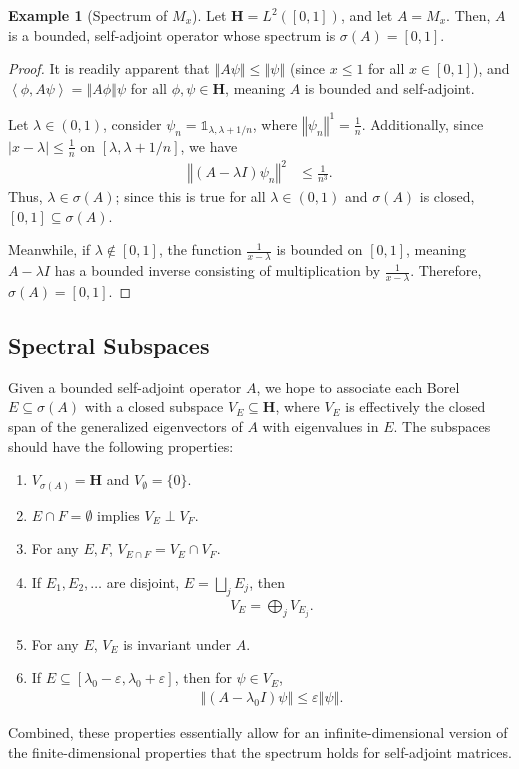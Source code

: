 \documentclass[10pt]{extarticle}
\newcommand{\iprod}[2]{\left\langle #1,#2\right\rangle}
\newcommand{\norm}[1]{\left\Vert #1\right\Vert}
\theoremstyle{plain}
\theoremstyle{definition}
\newtheorem*{example}{Example}
\theoremstyle{remark}
\renewcommand{\newline}{\hfill\break}
\begin{document}
  \begin{example}[Spectrum of $M_x$]
    Let $\mathbf{H} = L^{2}\left([0,1]\right)$, and let $A = M_x$. Then, $A$ is a bounded, self-adjoint operator whose spectrum is $\sigma(A) = [0,1]$.
  \end{example}
  \begin{proof}
    It is readily apparent that $\norm{A\psi} \leq \norm{\psi}$ (since $x\leq 1$ for all $x\in [0,1]$), and $\iprod{\phi}{A\psi} = \norm{A\phi}{\psi}$ for all $\phi,\psi \in \mathbf{H}$, meaning $A$ is bounded and self-adjoint.\newline

    Let $\lambda \in (0,1)$, consider $\psi_n = \mathbb{1}_{\lambda,\lambda + 1/n}$, where $\norm{\psi_n}^1 = \frac{1}{n}$. Additionally, since $|x - \lambda| \leq \frac{1}{n}$ on $[\lambda,\lambda + 1/n]$, we have
    \begin{align*}
      \norm{(A - \lambda I)\psi_n}^2 &\leq \frac{1}{n^3}.
    \end{align*}
    Thus, $\lambda \in \sigma(A)$; since this is true for all $\lambda \in (0,1)$ and $\sigma(A)$ is closed, $[0,1]\subseteq \sigma(A)$.\newline

    Meanwhile, if $\lambda \notin [0,1]$, the function $\frac{1}{x - \lambda}$ is bounded on $[0,1]$, meaning $A - \lambda I$ has a bounded inverse consisting of multiplication by $\frac{1}{x - \lambda}$. Therefore,$\sigma(A) = [0,1]$.
  \end{proof}
  \subsection{Spectral Subspaces}%
  Given a bounded self-adjoint operator $A$, we hope to associate each Borel $E\subseteq \sigma(A)$ with a closed subspace $V_E\subseteq \mathbf{H}$, where $V_E$  is effectively the closed span of the generalized eigenvectors of $A$ with eigenvalues in $E$. The subspaces should have the following properties:
  \begin{enumerate}[(1)]
    \item $V_{\sigma(A)} = \mathbf{H}$ and $V_{\emptyset} = \{0\}$.
    \item $E\cap F = \emptyset$ implies $V_E \perp V_F$.
    \item For any $E,F$, $V_{E\cap F} = V_E \cap V_F$.
    \item If $E_1,E_2,\dots$ are disjoint, $E = \bigsqcup_{j}E_j$, then
      \begin{align*}
        V_E = \bigoplus_{j} V_{E_j}.
      \end{align*}
    \item For any $E$, $V_E$ is invariant under $A$.
    \item If $E\subseteq [\lambda_0 - \varepsilon, \lambda_0 + \varepsilon]$, then for $\psi \in V_E$,
      \begin{align*}
        \norm{\left(A - \lambda_0 I\right)\psi} \leq \varepsilon \norm{\psi}.
      \end{align*}
  \end{enumerate}
  Combined, these properties essentially allow for an infinite-dimensional version of the finite-dimensional properties that the spectrum holds for self-adjoint matrices.
\end{document}
